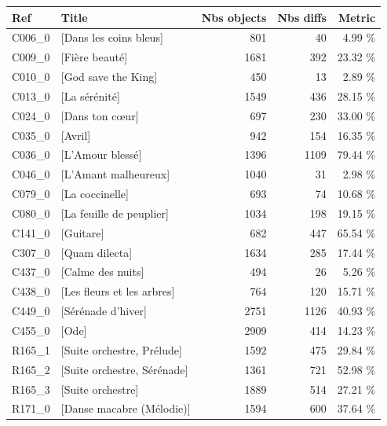 \begin{small}
\begin{tabular}{l|l|r|r|r}
\textbf{Ref} & \textbf{Title} & \textbf{Nbs objects} &  \textbf{Nbs diffs} & \textbf{Metric} \\ \hline
	C006\_0 & [Dans les coins bleus]  & 801 & 40 & 4.99 \% \\ 
		C009\_0 & [Fière beauté]  & 1681 & 392 & 23.32 \% \\ 
		C010\_0 & [God save the King] & 450 & 13 & 2.89 \% \\ 
		C013\_0 & [La sérénité]  & 1549 & 436 & 28.15 \% \\ 
		C024\_0 & [Dans ton cœur] & 697 & 230 & 33.00 \% \\ 
		C035\_0 & [Avril] & 942 & 154 & 16.35 \% \\ 
		C036\_0 & [L'Amour blessé] & 1396 & 1109 & 79.44 \% \\ 
		C046\_0 & [L'Amant malheureux] & 1040 & 31 & 2.98 \% \\ 
		C079\_0 & [La coccinelle]  & 693 & 74 & 10.68 \% \\ 
		C080\_0 & [La feuille de peuplier] & 1034 & 198 & 19.15 \% \\ 
		C141\_0 & [Guitare]  & 682 & 447 & 65.54 \% \\ 
		C307\_0 & [Quam dilecta] & 1634 & 285 & 17.44 \% \\ 
		C437\_0 & [Calme des nuits] & 494 & 26 & 5.26 \% \\ 
		C438\_0 & [Les fleurs et les arbres] & 764 & 120 & 15.71 \% \\ 
		C449\_0 & [Sérénade d'hiver]  & 2751 & 1126 & 40.93 \% \\ 
		C455\_0 & [Ode]  & 2909 & 414 & 14.23 \% \\ 
		R165\_1 & [Suite orchestre, Prélude] & 1592 & 475 & 29.84 \% \\ 
		R165\_2 & [Suite orchestre, Sérénade] & 1361 & 721 & 52.98 \% \\ 
		R165\_3 & [Suite orchestre] & 1889 & 514 & 27.21 \% \\ 
		R171\_0 & [Danse macabre (Mélodie)]  & 1594 & 600 & 37.64 \% \\ 
		\hline
\end{tabular}
\end{small}
	